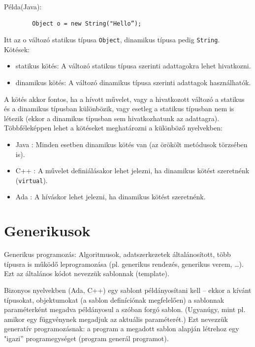 \documentclass[margin=0px]{article}
\begin{document}
	\noindent Példa(Java):
	\begin{verbatim}
		Object o = new String("Hello”);
	\end{verbatim} 
	Itt az o változó statikus típusa \texttt{Object}, dinamikus típusa pedig \texttt{String}.\\

	\noindent Kötések:
	\begin{itemize}
		\item	statikus kötés: A változó statikus típusa szerinti adattagokra lehet hivatkozni.
		\item	dinamikus kötés: A változó dinamikus típusa szerinti adattagok használhatók.
	\end{itemize}
	
	A kötés akkor fontos, ha a hívott művelet, vagy a hivatkozott változó a statikus és a dinamikus típusban
	különbözik, vagy esetleg a statikus típusban nem is létezik (ekkor a dinamikus típusban sem hivatkozhatunk
	az adattagra).\\

	\noindent Többféleképpen lehet a kötéseket meghatározni a különböző nyelvekben:
	\begin{itemize}
		\item	Java : Minden esetben dinamikus kötés van (az örökölt metódusok törzsében is).
		\item	C++ : A művelet definiálásakor lehet jelezni, ha dinamikus kötést szeretnénk (\texttt{virtual}).
		\item	Ada : A híváskor lehet jelezni, ha dinamikus kötést szeretnénk.
	\end{itemize}

	
	\section{Generikusok}
	
	Generikus programozás: Algoritmusok, adatszerkezetek általánosított, több típusra is működő
	leprogramozása (pl. generikus rendezés, generikus verem, …). Ezt az általános kódot nevezzük sablonnak
	(template).
	
	Bizonyos nyelvekben (Ada, C++) egy sablont példányosítani kell – ekkor a kívánt típusokat, objektumokat
	(a sablon definíciónak megfelelően) a sablonnak paraméterként megadva példányosul a szóban forgó sablon.
	(Ugyanúgy, mint pl. amikor egy függvénynek megadjuk az aktuális paraméterét.) Ezt nevezzük generatív
	programozásnak: a program a megadott sablon alapján létrehoz egy "igazi” programegységet (program
	generál programot).
	
\end{document}

